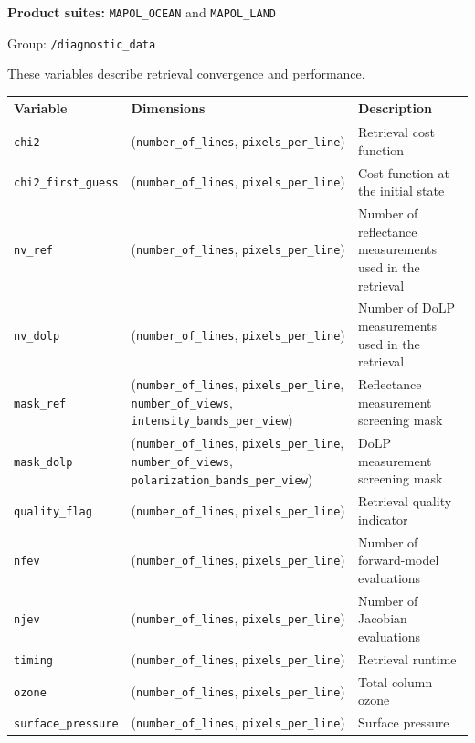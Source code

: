 \documentclass[
  11pt,
  letterpaper,
]{scrreprt}
\begin{document}
\textbf{Product suites:} \texttt{MAPOL\_OCEAN} and \texttt{MAPOL\_LAND}

Group: \texttt{/diagnostic\_data}

These variables describe retrieval convergence and performance.

\begin{longtable}[]{@{}
  >{\raggedright\arraybackslash}p{}
  >{\raggedright\arraybackslash}p{}
  >{\raggedright\arraybackslash}p{}@{}}
\toprule\noalign{}
\begin{minipage}[b]{\linewidth}\raggedright
Variable
\end{minipage} & \begin{minipage}[b]{\linewidth}\raggedright
Dimensions
\end{minipage} & \begin{minipage}[b]{\linewidth}\raggedright
Description
\end{minipage} \\
\midrule\noalign{}
\endhead
\bottomrule\noalign{}
\endlastfoot
\texttt{chi2} & (\texttt{number\_of\_lines}, \texttt{pixels\_per\_line})
& Retrieval cost function \\
\texttt{chi2\_first\_guess} & (\texttt{number\_of\_lines},
\texttt{pixels\_per\_line}) & Cost function at the initial state \\
\texttt{nv\_ref} & (\texttt{number\_of\_lines},
\texttt{pixels\_per\_line}) & Number of reflectance measurements used in
the retrieval \\
\texttt{nv\_dolp} & (\texttt{number\_of\_lines},
\texttt{pixels\_per\_line}) & Number of DoLP measurements used in the
retrieval \\
\texttt{mask\_ref} & (\texttt{number\_of\_lines},
\texttt{pixels\_per\_line}, \texttt{number\_of\_views},
\texttt{intensity\_bands\_per\_view}) & Reflectance measurement
screening mask \\
\texttt{mask\_dolp} & (\texttt{number\_of\_lines},
\texttt{pixels\_per\_line}, \texttt{number\_of\_views},
\texttt{polarization\_bands\_per\_view}) & DoLP measurement screening
mask \\
\texttt{quality\_flag} & (\texttt{number\_of\_lines},
\texttt{pixels\_per\_line}) & Retrieval quality indicator \\
\texttt{nfev} & (\texttt{number\_of\_lines}, \texttt{pixels\_per\_line})
& Number of forward-model evaluations \\
\texttt{njev} & (\texttt{number\_of\_lines}, \texttt{pixels\_per\_line})
& Number of Jacobian evaluations \\
\texttt{timing} & (\texttt{number\_of\_lines},
\texttt{pixels\_per\_line}) & Retrieval runtime \\
\texttt{ozone} & (\texttt{number\_of\_lines},
\texttt{pixels\_per\_line}) & Total column ozone \\
\texttt{surface\_pressure} & (\texttt{number\_of\_lines},
\texttt{pixels\_per\_line}) & Surface pressure \\
\end{longtable}
\end{document}
